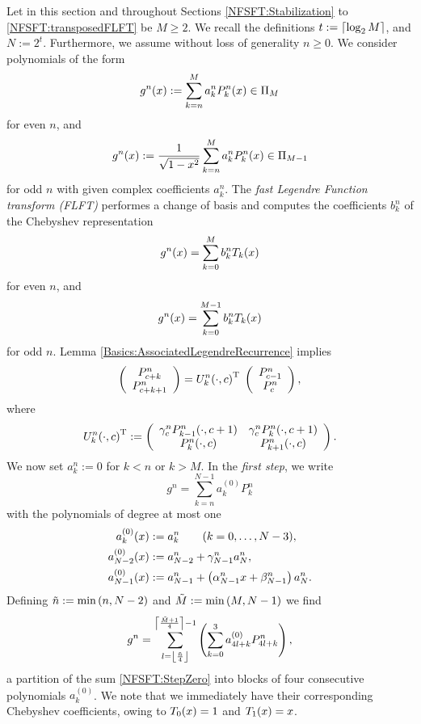 Let in this section and throughout Sections \ref{NFSFT:Stabilization} to 
\ref {NFSFT:transposedFLFT} be $M \ge 2$. We recall the definitions 
$t := \left\lceil\log_{2}M\right\rceil$, and $N := 2^t$. Furthermore, we assume without loss of generality $n \ge 0$.
We consider polynomials of the form
\begin{equation}
  \label{NFSFT:GnEven}
 g^n{\hspace{-0.4ex}}\left(x\right) := \sum_{k=n}^M a_k^n P_k^n{\hspace{-0.4ex}}\left(x\right) \in \Pi_M
 \end{equation}
for even $n$, and
\begin{equation}
  \label{NFSFT:GnOdd}
  g^n{\hspace{-0.4ex}}\left(x\right) := \frac{1}{\sqrt{1-x^2}} \sum_{k=n}^M a_k^n P_k^n{\hspace{-0.4ex}}\left(x\right) \in \Pi_{M-1}
\end{equation}
for odd $n$ with given complex coefficients $a_k^n$.
The \emph{fast Legendre Function transform (FLFT)} performes a change of basis and computes the 
coefficients $b_k^n$ of the Chebyshev representation
\[ g^n{\hspace{-0.4ex}}\left(x\right) = \sum_{k=0}^M b_k^n T_k{\hspace{-0.4ex}}\left(x\right)\]
for even $n$, and
\[g^n{\hspace{-0.4ex}}\left(x\right) = \sum_{k=0}^{M-1} b_k^n T_k{\hspace{-0.4ex}}\left(x\right)\]
for odd $n$.
Lemma \ref{Basics:AssociatedLegendreRecurrence} implies
\begin{equation}
  \label{NFSFT:U}
  \left(\begin{array}{c}
    P_{c+k}^{n} \\ P_{c+k+1}^{n}
  \end{array}\right)
  =
  U_{k}^{n}{\hspace{-0.4ex}}\left(\cdot,c\right)^{\text{\rm{T}}}\;
  \left(\begin{array}{c}
    P_{c-1}^{n} \\ P_{c}^{n}
  \end{array}\right),
\end{equation}
where
\[
  U_{k}^{n}{\hspace{-0.4ex}}\left(\cdot,c\right)^{\text{\rm{T}}} :=
  \left(\begin{array}{cc}
    \gamma_c^{n} P_{k-1}^{n}{\hspace{-0.4ex}}\left(\cdot,c+1\right) & \gamma_c^{n} P_{k}^{n}{\hspace{-0.4ex}}\left(\cdot,c+1\right) \\
                 P_{k}^{n}{\hspace{-0.4ex}}\left(\cdot,c\right)     &              P_{k+1}^{n}{\hspace{-0.4ex}}\left(\cdot,c\right)
  \end{array}\right).   
\]
We now set $a_k^n := 0$ for $k < n$ or $k > M$. In the \emph{first step}, we write
\begin{equation} 
  \label{NFSFT:StepZero}
  g^n = \sum_{k = n}^{N-1} a_{k}^{(0)} P_k^{n}
\end{equation}
with the polynomials of degree at most one
\begin{align*}
  a_k^{(0)}{\hspace{-0.4ex}}\left(x\right)     & := a_k^n \qquad (k = 0,\ldots,N-3),\\
  a_{N-2}^{(0)}{\hspace{-0.4ex}}\left(x\right) & := a_{N-2}^n + \gamma_{N-1}^{n} a_N^n,\\
  a_{N-1}^{(0)}{\hspace{-0.4ex}}\left(x\right) & := a_{N-1}^n + \left(\alpha_{N-1}^{n}x + \beta_{N-1}^{n}\right) a_N^n.
\end{align*}
Defining
$
\tilde{n} := \min{\hspace{-0.4ex}}\left(n,N-2\right)$ and $\tilde{M} := \min{\hspace{-0.4ex}}\left(M,N-1\right)
$
we find
\[
  g^n = \sum_{l = \left\lfloor\frac{\tilde{n}}{4}\right\rfloor}^{\left\lceil\frac{\tilde{M}+1}{4}\right\rceil-1} \left(\sum_{k=0}^{3} a_{4l+k}^{(0)} P_{4l+k}^{n}\right),
\]
a partition of the sum \eqref{NFSFT:StepZero} into blocks of four consecutive polynomials $a_{k}^{(0)}$.
We note that we immediately have their corresponding Chebyshev coefficients, owing to $T_{0}{\hspace{-0.4ex}}\left(x\right) = 1$ and
$T_{1}{\hspace{-0.4ex}}\left(x\right)=x$.

